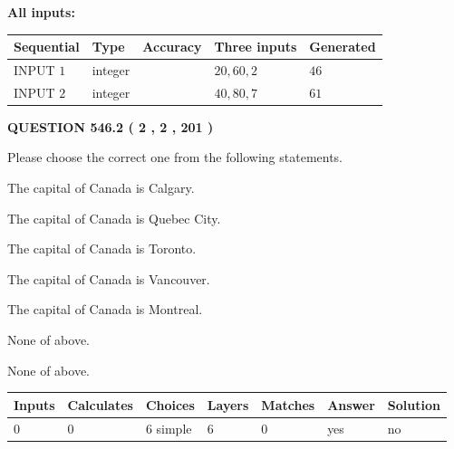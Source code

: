 \documentclass[12pt]{article}
\begin{document}
   
   
   
\noindent\vspace{0.1in}\hspace{-0.08in} {\textbf{\Large{All inputs: }}}
   
   
  
  
\noindent\begin{tabular}{|l|l|l|l|l|}
\hline
 Sequential & Type & Accuracy & Three inputs & Generated \\ 
\hline
 
 
  INPUT $  1 $ & integer &  & $
 20
 , 
 60
 , 
 2
 $ & $ 46 $ 
 \\  \hline  
 
 
  INPUT $  2 $ & integer &  & $
 40
 , 
 80
 , 
 7
 $ & $ 61 $ 
 \\  \hline  
 \end{tabular}
   
   
  
\vspace{0.2in}
  
{\textbf{\Large{QUESTION
546.2 
 ( 2 , 2 , 201 )
}}}
  
  
Please choose the correct one from the following statements.
 
 
The capital of Canada is Calgary.
 
 
The capital of Canada is Quebec City.
 
 
The capital of Canada is Toronto.
 
 
The capital of Canada is Vancouver.
 
 
The capital of Canada is Montreal.
 
 
 None of above.
 
 
\noindent{}
 
 
 None of above.
 
 
\noindent{}
 
 
   
   
   
   
\noindent\begin{tabular}{|l|l|l|l|l|l|l|}
 \hline
Inputs & Calculates & Choices & Layers & Matches & Answer & Solution \\ \hline
 0  & 
 0  & 
 6
  simple  
  & 
 6  & 
 0  & 
  yes & 
  no 
  \\ \hline
 \end{tabular}
   
\end{document}
